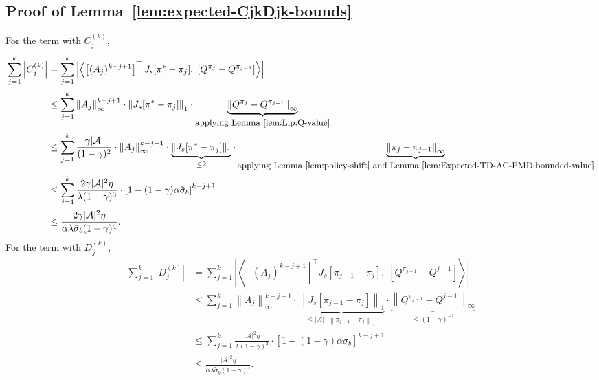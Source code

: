 \documentclass[10pt]{article}
\newcommand{\calA}{\mathcal{A}}
\newcommand{\ls}{\left}
\newcommand{\rs}{\right}
\newcommand{\inner}[2]{\ls\langle #1, \; #2 \rs\rangle}
\theoremstyle{plain}
\theoremstyle{definition}
\begin{document}
    \subsection{Proof of Lemma~\ref{lem:expected-CjkDjk-bounds}}\label{sec:expected-CjkDjk-bounds}
     For the term with $C_j^{(k)}$,
 \begin{align*}
        \sum_{j=1}^k \ls| C_j^{(k)} \rs| &= \sum_{j=1}^k \ls| \inner{\ls[ (A_j)^{k-j+1} \rs]^\top J_s [\pi^* - \pi_j]}{[Q^{\pi_j} - Q^{\pi_{j-1}}]} \rs| \\
        &\leq \sum_{j=1}^k\ls\| A_j \rs\|_\infty^{k-j+1} \cdot \ls\| J_s[\pi^* - \pi_j] \rs\|_1 \cdot \underbrace{\ls\| Q^{\pi_j} - Q^{\pi_{j-1}} \rs\|_\infty}_{\mbox{\small applying Lemma~\ref{lem:Lip:Q-value}}} \\
        &\leq \sum_{j=1}^k\frac{\gamma|\calA|}{(1-\gamma)^2} \cdot \ls\| A_j \rs\|_\infty^{k-j+1} \cdot \underbrace{\ls\| J_s[\pi^* - \pi_j] \rs\|_1}_{\leq 2} \cdot \underbrace{\ls\| \pi_j - \pi_{j-1} \rs\|_\infty}_{\mbox{\small applying Lemma~\ref{lem:policy-shift} and Lemma~\ref{lem:Expected-TD-AC-PMD:bounded-value}}} \\
        &\leq \sum_{j=1}^k\frac{2\gamma |\calA|^2\eta}{\lambda(1-\gamma)^3} \cdot \ls[ 1-(1-\gamma)\alpha\tilde \sigma_b \rs]^{k-j+1} \\
        &\leq \frac{2\gamma |\calA|^2 \eta}{\alpha\lambda\tilde \sigma_b(1-\gamma)^4}.
    \end{align*}
    For the term with  $D_j^{(k)}$, 
    \begin{align*}
        \sum_{j=1}^k \ls| D_j^{(k)} \rs| &= \sum_{j=1}^k\ls| \inner{\ls[\ls( A_j \rs)^{k-j+1}\rs]^\top J_s [\pi_{j-1} - \pi_j]}{[Q^{\pi_{j-1}} - Q^{j-1}]} \rs| \\
        &\leq \sum_{j=1}^k\ls\| A_j \rs\|_\infty^{k-j+1} \cdot \underbrace{\ls\| J_s [\pi_{j-1} - \pi_j] \rs\|_1}_{\leq |\calA| \cdot \ls\| \pi_{j-1} - \pi_j \rs\|_\infty} \cdot \underbrace{\ls\| Q^{\pi_{j-1}} - Q^{j-1} \rs\|_\infty}_{\leq (1-\gamma)^{-1}} \\
        &\leq \sum_{j=1}^k\frac{|\calA|^2\eta}{\lambda(1-\gamma)^2} \cdot \ls[ 1 - (1-\gamma) \alpha \tilde \sigma_b \rs]^{k-j+1} \\
        &\leq \frac{|\calA|^2\eta}{\alpha\lambda\tilde \sigma_b(1-\gamma)^3}.
    \end{align*}

\end{document}
